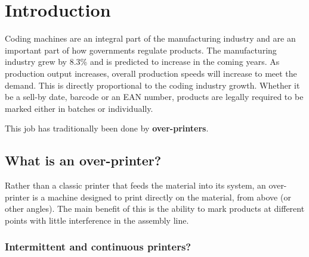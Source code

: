 \chapter{Introduction}
\pagestyle{fancy}

Coding machines are an integral part of the manufacturing industry and are an important part of how governments regulate products. The manufacturing industry grew by 8.3\% and is predicted to increase in the coming years.
As production output increases, overall production speeds will increase to meet the demand. This is directly proportional to the coding industry growth. Whether it be a sell-by date, barcode or an EAN number, products are legally required to be marked either in batches or individually. 

\bigskip
This job has traditionally been done by \textbf{over-printers}.










\bigskip

\section{What is an over-printer?}

Rather than a classic printer that feeds the material into its system, an over-printer is a machine designed to print directly on the material, from above (or other angles). The main benefit of this is the ability to mark products at different points with little interference in the assembly line.

\subsection{Intermittent and continuous printers?}

